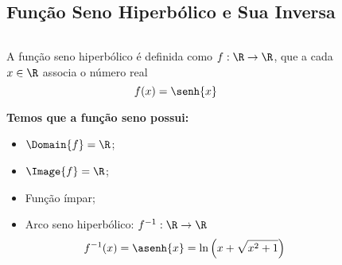 \subsection{Função Seno Hiperbólico e Sua Inversa}
\begin{frame}
  \begin{columns}[onlytextwidth]
    \begin{column}{0.49\textwidth}\vspace{-0.5cm}
      \begin{definition}
        A função seno hiperbólico é definida como $f:\R\rightarrow\R$, que a cada $x\in\R$ associa o número real
        \begin{equation*}
          f(x) = \senh{x}
        \end{equation*}
      \end{definition}
      \begin{highlight}
        \textbf{Temos que a função seno possui:}
        \begin{itemize}
          \item $\Domain{f} = \R$;
          \item $\Image{f} = \R$;
          \item Função ímpar;
          \item<2> Arco seno hiperbólico: $f^{-1}:\R\rightarrow\R$\small
          \begin{equation*}
            f^{-1}(x)=\asenh{x} = \ln{\left(x + \sqrt{x^{2}+1}\right)}
          \end{equation*}
        \end{itemize}
      \end{highlight}
    \end{column}
    \begin{column}{0.49\textwidth}\vspace*{-0.5cm}
      \begin{figure}
      \end{figure}
    \end{column}
  \end{columns}
\end{frame}


